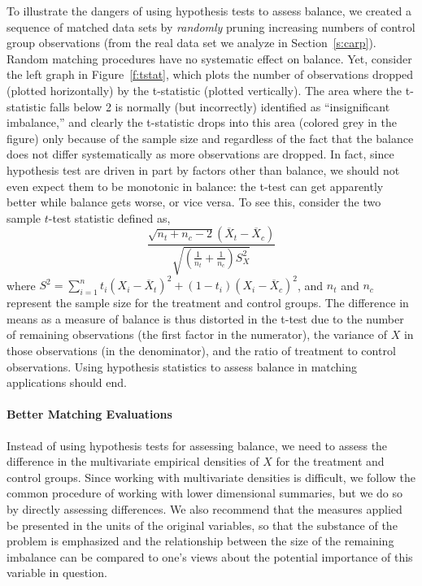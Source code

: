 \documentclass[11pt,titlepage]{article}
\begin{document}
To illustrate the dangers of using hypothesis tests to assess balance,
we created a sequence of matched data sets by \emph{randomly} pruning
increasing numbers of control group observations (from the real data
set we analyze in Section~\ref{s:carp}).  Random matching procedures
have no systematic effect on balance.  Yet, consider the left graph in
Figure~\ref{f:tstat}, which plots the number of observations dropped
(plotted horizontally) by the t-statistic (plotted vertically).  The
area where the t-statistic falls below 2 is normally (but incorrectly)
identified as ``insignificant imbalance,'' and clearly the t-statistic
drops into this area (colored grey in the figure) only because of the
sample size and regardless of the fact that the balance does not
differ systematically as more observations are dropped.  In fact,
since hypothesis test are driven in part by factors other than
balance, we should not even expect them to be monotonic in balance:
the t-test can get apparently better while balance gets worse, or vice
versa. To see this, consider the two sample $t$-test statistic defined
as,
\begin{equation}
\frac{\sqrt{n_t+n_c-2}(\overline{X}_t-\overline{X}_c)}{\sqrt{\left(\frac{1}{n_t}
    +\frac{1}{n_c}\right)S^2_X}}
\end{equation} 
where $S^2=\sum_{i=1}^n t_i(X_i - \overline{X}_t)^2+ (1-t_i)(X_i -
\overline{X}_c)^2$, and $n_t$ and $n_c$ represent the sample size for
the treatment and control groups.  The difference in means as a
measure of balance is thus distorted in the t-test due to the number
of remaining observations (the first factor in the numerator), the
variance of $X$ in those observations (in the denominator), and the
ratio of treatment to control observations.  Using hypothesis
statistics to assess balance in matching applications should end.

\paragraph{Better Matching Evaluations}

Instead of using hypothesis tests for assessing balance, we need to
assess the difference in the multivariate empirical densities of $X$
for the treatment and control groups.  Since working with multivariate
densities is difficult, we follow the common procedure of working with
lower dimensional summaries, but we do so by directly assessing
differences.  We also recommend that the measures applied be presented
in the units of the original variables, so that the substance of the
problem is emphasized and the relationship between the size of the
remaining imbalance can be compared to one's views about the potential
importance of this variable in question.
\end{document}
